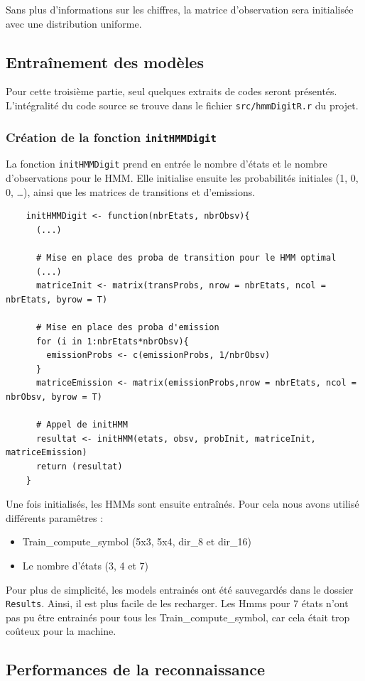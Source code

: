 Sans plus d'informations sur les chiffres, la matrice d'observation sera initialisée avec une distribution uniforme.


\subsection{Entraînement des modèles}

Pour cette troisième partie, seul quelques extraits de codes seront présentés. L'intégralité du code source se trouve dans le fichier \texttt{src/hmmDigitR.r} du projet. 

\subsubsection*{Création de la fonction \texttt{initHMMDigit}}
La fonction \texttt{initHMMDigit} prend en entrée le nombre d'états et le nombre d'observations pour le HMM. Elle initialise ensuite les probabilités initiales (1, 0, 0, \dots), ainsi que les matrices de transitions et d'emissions.\\

\newpage

\begin{lstlisting}
	initHMMDigit <- function(nbrEtats, nbrObsv){
	  (...)
		
	  # Mise en place des proba de transition pour le HMM optimal
	  (...)
	  matriceInit <- matrix(transProbs, nrow = nbrEtats, ncol = nbrEtats, byrow = T)
	  
	  # Mise en place des proba d'emission
	  for (i in 1:nbrEtats*nbrObsv){
		emissionProbs <- c(emissionProbs, 1/nbrObsv)
	  }
	  matriceEmission <- matrix(emissionProbs,nrow = nbrEtats, ncol = nbrObsv, byrow = T)
	  
	  # Appel de initHMM
	  resultat <- initHMM(etats, obsv, probInit, matriceInit, matriceEmission)
	  return (resultat)
	}
\end{lstlisting}

Une fois initialisés, les HMMs sont ensuite entraînés. Pour cela nous avons utilisé différents paramêtres :
\begin{itemize}
	\item Train\_compute\_symbol (5x3, 5x4, dir\_8 et dir\_16)
	\item Le nombre d'états (3, 4 et 7)
\end{itemize}

\vspace{0.5cm}

Pour plus de simplicité, les models entrainés ont été sauvegardés dans le dossier \texttt{Results}. Ainsi, il est plus facile de les recharger. Les Hmms pour 7 états n'ont pas pu être entrainés pour tous les Train\_compute\_symbol, car cela était trop coûteux pour la machine.


\subsection{Performances de la reconnaissance}



